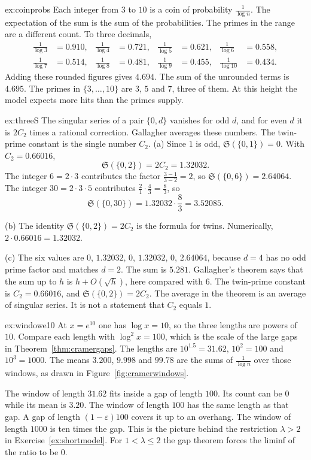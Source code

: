 \begin{solution}{ex:coinprobs}
\idea Each integer from $3$ to $10$ is a coin of probability $\frac1{\log n}$. The expectation of the sum is the sum of the probabilities. The primes in the range are a different count.
\writeup To three decimals,
\[
\begin{aligned}
\frac1{\log3}&=0.910,&
\frac1{\log4}&=0.721,&
\frac1{\log5}&=0.621,&
\frac1{\log6}&=0.558,\\
\frac1{\log7}&=0.514,&
\frac1{\log8}&=0.481,&
\frac1{\log9}&=0.455,&
\frac1{\log10}&=0.434.
\end{aligned}
\]
Adding these rounded figures gives $4.694$. The sum of the unrounded terms is $4.695$. The primes in $\{3,\dots,10\}$ are $3$, $5$ and $7$, three of them. At this height the model expects more hits than the primes supply.
\end{solution}

\begin{solution}{ex:threeS}
\idea The singular series of a pair $\{0,d\}$ vanishes for odd $d$, and for even $d$ it is $2C_2$ times a rational correction. Gallagher averages these numbers. The twin-prime constant is the single number $C_2$.
\writeup (a) Since $1$ is odd, $\mathfrak S(\{0,1\})=0$. With $C_2=0.66016$,
\[
\mathfrak S(\{0,2\})=2C_2=1.32032.
\]
The integer $6=2\cdot3$ contributes the factor $\frac{3-1}{3-2}=2$, so $\mathfrak S(\{0,6\})=2.64064$. The integer $30=2\cdot3\cdot5$ contributes $\frac{2}{1}\cdot\frac{4}{3}=\frac83$, so
\[
\mathfrak S(\{0,30\})=1.32032\cdot\frac83=3.52085.
\]

(b) The identity $\mathfrak S(\{0,2\})=2C_2$ is the formula for twins. Numerically, $2\cdot0.66016=1.32032$.

(c) The six values are $0$, $1.32032$, $0$, $1.32032$, $0$, $2.64064$, because $d=4$ has no odd prime factor and matches $d=2$. The sum is $5.281$. Gallagher's theorem says that the sum up to $h$ is $h+O(\sqrt h)$, here compared with $6$. The twin-prime constant is $C_2=0.66016$, and $\mathfrak S(\{0,2\})=2C_2$. The average in the theorem is an average of singular series. It is not a statement that $C_2$ equals $1$.
\end{solution}

\begin{solution}{ex:windowe10}
\idea At $x=e^{10}$ one has $\log x=10$, so the three lengths are powers of $10$. Compare each length with $\log^2 x=100$, which is the scale of the large gaps in Theorem~\ref{thm:cramergaps}.
\writeup The lengths are $10^{1.5}=31.62$, $10^2=100$ and $10^3=1000$. The means $3.200$, $9.998$ and $99.78$ are the sums of $\frac1{\log n}$ over those windows, as drawn in Figure~\ref{fig:cramerwindows}.

The window of length $31.62$ fits inside a gap of length $100$. Its count can be $0$ while its mean is $3.20$. The window of length $100$ has the same length as that gap. A gap of length $(1-\varepsilon)100$ covers it up to an overhang. The window of length $1000$ is ten times the gap. This is the picture behind the restriction $\lambda>2$ in Exercise~\ref{ex:shortmodel}. For $1<\lambda\le 2$ the gap theorem forces the liminf of the ratio to be $0$.
\end{solution}

